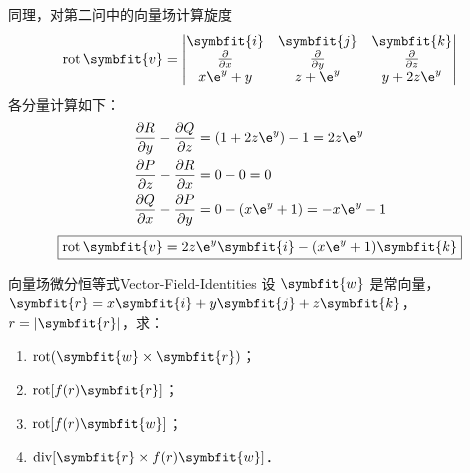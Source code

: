 \begin{solution}
    同理，对第二问中的向量场计算旋度
    \begin{equation} \label{eq:curl-def-2}
        \operatorname{rot} \symbfit{v} = \begin{vmatrix} \symbfit{i} & \symbfit{j} & \symbfit{k} \\ \frac{\partial}{\partial x} & \frac{\partial}{\partial y} & \frac{\partial}{\partial z} \\ x \e^y + y & z + \e^y & y + 2z \e^y \end{vmatrix}
    \end{equation}
    各分量计算如下：
    \begin{equation} \label{eq:curl-res-2}
        \begin{aligned}
            \frac{\partial R}{\partial y} - \frac{\partial Q}{\partial z} & = (1 + 2z \e^y) - 1 = 2z \e^y    \\
            \frac{\partial P}{\partial z} - \frac{\partial R}{\partial x} & = 0 - 0 = 0                      \\
            \frac{\partial Q}{\partial x} - \frac{\partial P}{\partial y} & = 0 - (x \e^y + 1) = -x \e^y - 1
        \end{aligned}
    \end{equation}
    \begin{equation}
        \boxed{\operatorname{rot} \symbfit{v} = 2z \e^y \symbfit{i} - (x \e^y + 1) \symbfit{k}}
    \end{equation}
\end{solution}


\begin{problem}{向量场微分恒等式}{Vector-Field-Identities}
    设 $\symbfit{w}$ 是常向量，$\symbfit{r} = x \symbfit{i} + y \symbfit{j} + z \symbfit{k}$，$r = |\symbfit{r}|$，求：
    \begin{enumerate}
        \item $\operatorname{rot} (\symbfit{w} \times \symbfit{r})$；
        \item $\operatorname{rot} [f(r) \symbfit{r}]$；
        \item $\operatorname{rot} [f(r) \symbfit{w}]$；
        \item $\operatorname{div} [\symbfit{r} \times f(r) \symbfit{w}]$．
    \end{enumerate}
\end{problem}

